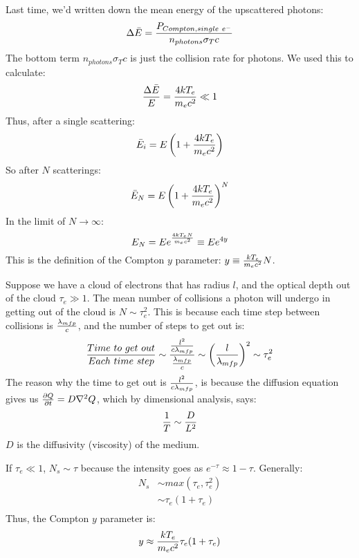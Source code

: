 \documentclass[11pt]{article}
\def\_{\bar}
\def\inv#1{{1 \over #1}}
\begin{document}
Last time, we'd written down the mean energy of the upscattered photons:
$$\Delta\_E={P_{Compton,single\ e^-}\over n_{photons}\sigma_Tc}$$
The bottom term $n_{photons}\sigma_Tc$ is just the collision rate for
photons. We used this to calculate:
$${\Delta\_E\over E}={4kT_e\over m_ec^2}\ll1$$
Thus, after a single scattering:
$$\_E_i=E\left(1+{4kT_e\over m_ec^2}\right)$$
So after $N$ scatterings:
$$\_E_N=E\left(1+{4kT_e\over m_ec^2}\right)^N$$
In the limit of $N\to\infty$:
$$E_N=Ee^{4kT_eN\over m_ec^2}\equiv Ee^{4y}$$
This is the definition of the Compton $y$ parameter: $y\equiv {kT_e\over m_e
c^2}N$.\par
Suppose we have a cloud of electrons that has radius $l$, and the optical
depth out of the cloud $\tau_e\gg1$.  The mean number of collisions a photon 
will undergo in getting out of the cloud is $N\sim\tau_e^2$.  This is because
each time step between collisions is ${\lambda_{mfp}\over c}$, and the number
of steps to get out is:
$${Time\ to\ get\ out\over Each\ time\ step}\sim{{l^2\over c\lambda_{mfp}}
\over {\lambda_{mfp}\over c}}\sim\left({l\over\lambda_{mfp}}\right)^2
\sim\tau_e^2$$
\def\ppt#1{{\partial #1\over\partial t}}
The reason why the time to get out is $l^2\over c\lambda_{mfp}$, is because
the diffusion equation gives us $\ppt{Q}=D\nabla^2Q$, which by dimensional
analysis, says:
$$\inv{T}\sim{D\over L^2}$$
$D$ is the diffusivity (viscosity) of the medium.\par
If $\tau_e\ll1$, $N_s\sim\tau$ because the intensity goes as $e^{-\tau}\approx
1-\tau$.  Generally:
$$\begin{aligned}N_s&\sim max(\tau_e,\tau_e^2)\\ 
&\sim\tau_e(1+\tau_e)\\ \end{aligned}$$
Thus, the Compton $y$ parameter is:
$$y\approx {kT_e\over m_ec^2}\tau_e(1+\tau_e)$$
\end{document}
